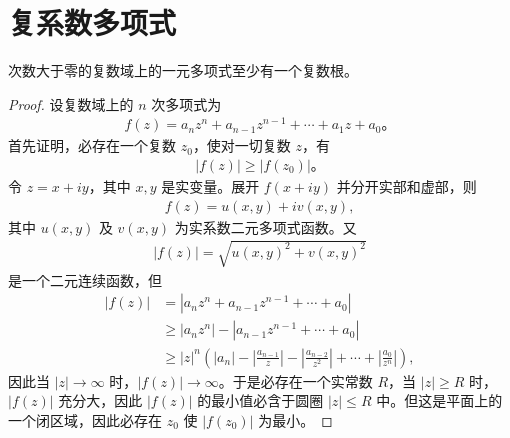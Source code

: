 \documentclass[../../main.tex]{subfiles}%
\begin{document}
\section{复系数多项式}

\begin{theorem}[代数基本定理]\label{theorem:代数基本定理}
次数大于零的复数域上的一元多项式至少有一个复数根。
\end{theorem}
\begin{proof}

设复数域上的 $n$ 次多项式为
\begin{align}
f(z) = a_n z^n + a_{n-1} z^{n-1} + \cdots + a_1 z + a_0。 \label{theorem5.14-5.6.1}
\end{align}
首先证明，必存在一个复数 $z_0$，使对一切复数 $z$，有
\begin{align*}
|f(z)| \geqslant  |f(z_0)|。
\end{align*}
令 $z = x + iy$，其中 $x, y$ 是实变量。展开 $f(x + iy)$ 并分开实部和虚部，则
\begin{align*}
f(z) = u(x, y) + iv(x, y),
\end{align*}
其中 $u(x, y)$ 及 $v(x, y)$ 为实系数二元多项式函数。又
\begin{align*}
|f(z)| = \sqrt{u(x, y)^2 + v(x, y)^2}
\end{align*}
是一个二元连续函数，但
\begin{align*}
|f(z)| &= |a_n z^n + a_{n-1} z^{n-1} + \cdots + a_0| \\
&\geqslant  |a_n z^n| - |a_{n-1} z^{n-1} + \cdots + a_0| \\
&\geqslant  |z|^n \left( |a_n| - \left| \frac{a_{n-1}}{z} \right| - \left| \frac{a_{n-2}}{z^2} \right| + \cdots + \left| \frac{a_0}{z^n} \right| \right),
\end{align*}
因此当 $|z| \to \infty$ 时，$|f(z)| \to \infty$。于是必存在一个实常数 $R$，当 $|z| \geqslant  R$ 时，$|f(z)|$ 充分大，因此 $|f(z)|$ 的最小值必含于圆圈 $|z| \leqslant  R$ 中。但这是平面上的一个闭区域，因此必存在 $z_0$ 使 $|f(z_0)|$ 为最小。


\end{proof}
\end{document}
